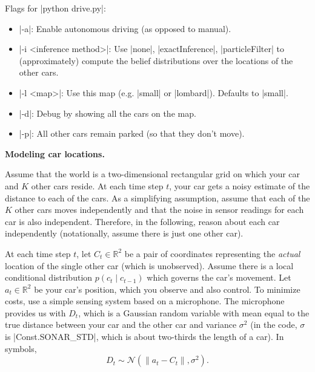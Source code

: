 Flags for |python drive.py|:
\begin{itemize}
  \item |-a|: Enable autonomous driving (as opposed to manual).
  \item |-i <inference method>|: Use |none|, |exactInference|, |particleFilter|
  to (approximately) compute the belief distributions over the locations of the
  other cars.
  \item |-l <map>|: Use this map (e.g. |small| or |lombard|). Defaults to
  |small|.
  \item |-d|: Debug by showing all the cars on the map.
  \item |-p|: All other cars remain parked (so that they don't move).
\end{itemize}
\clearpage

{\bf Modeling car locations.}

Assume that the world is a two-dimensional rectangular grid on which your car
and $K$ other cars reside. At each time step $t$, your car gets a noisy estimate
of the distance to each of the cars.  As a simplifying assumption, assume
that each of the $K$ other cars moves independently and that the noise in sensor
readings for each car is also independent. Therefore, in the following, 
reason about each car independently (notationally, assume there is just
one other car).

At each time step $t$, let $C_t \in \mathbb R^2$ be a pair of coordinates representing the {\em actual} location of the single other car (which is
unobserved). Assume there is a local conditional distribution $p(c_t \mid
c_{t-1})$ which governs the car's movement. Let $a_t \in \mathbb R^2$ be your
car's position, which you observe and also control. To minimize costs, use a
simple sensing system based on a microphone. The microphone provides us with
$D_t$, which is a Gaussian random variable with mean equal to the true distance
between your car and the other car and variance $\sigma^2$ (in the code,
$\sigma$ is |Const.SONAR_STD|, which is about two-thirds the length of a car).
In symbols,
\[D_t \sim \mathcal N(\|a_t - C_t\|, \sigma^2).\]

